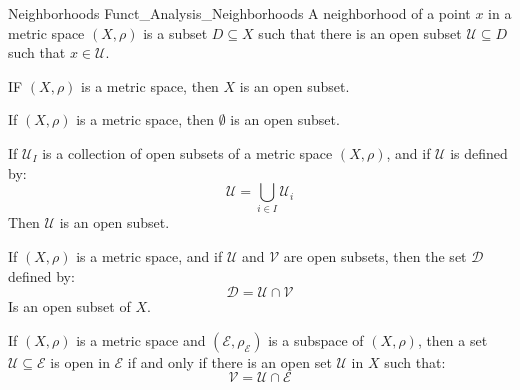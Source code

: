         \begin{ldefinition}{Neighborhoods}
              {Funct_Analysis_Neighborhoods}
            A neighborhood of a point $x$ in a metric space
            $(X,\rho)$ is a subset $D\subseteq{X}$ such
            that there is an open subset
            $\mathcal{U}\subseteq{D}$ such that
            $x\in\mathcal{U}$.
        \end{ldefinition}
        \begin{theorem}
            IF $(X,\rho)$ is a metric space, then $X$ is
            an open subset.
        \end{theorem}
        \begin{theorem}
            If $(X,\rho)$ is a metric space, then
            $\emptyset$ is an open subset.
        \end{theorem}
        \begin{theorem}
            If $\mathcal{U}_{I}$ is a collection of open subsets
            of a metric space $(X,\rho)$, and if
            $\mathcal{U}$ is defined by:
            \begin{equation}
                \mathcal{U}=\bigcup_{i\in{I}}\mathcal{U}_{i}
            \end{equation}
            Then $\mathcal{U}$ is an open subset.
        \end{theorem}
        \begin{theorem}
            If $(X,\rho)$ is a metric space, and if
            $\mathcal{U}$ and $\mathcal{V}$ are open
            subsets, then the set $\mathcal{D}$ defined by:
            \begin{equation}
                \mathcal{D}=\mathcal{U}\cap\mathcal{V}
            \end{equation}
            Is an open subset of $X$.
        \end{theorem}
        \begin{theorem}
            If $(X,\rho)$ is a metric space and
            $(\mathcal{E},\rho_{\mathcal{E}})$ is a subspace
            of $(X,\rho)$, then a set
            $\mathcal{U}\subseteq\mathcal{E}$
            is open in $\mathcal{E}$ if and only if there is
            an open set $\mathcal{U}$ in $X$ such that:
            \begin{equation}
                \mathcal{V}=\mathcal{U}\cap\mathcal{E}
            \end{equation}
        \end{theorem}
